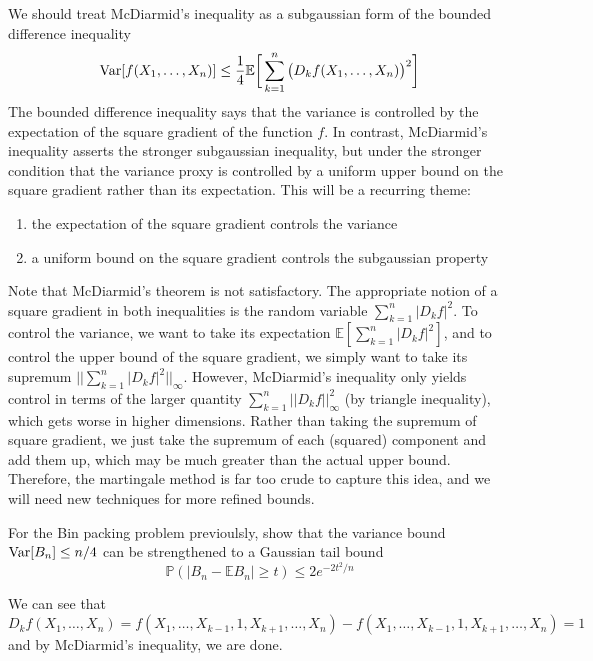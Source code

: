   We should treat McDiarmid's inequality as a subgaussian form of the bounded difference inequality 
  \[\Var[ f(X_1, \ldots, X_n)] \leq \frac{1}{4} \mathbb{E} \bigg[ \sum_{k=1}^n \big(D_k f (X_1, \ldots, X_n)\big)^2 \bigg]\]
  The bounded difference inequality says that the variance is controlled by the expectation of the square gradient of the function $f$. In contrast, McDiarmid's inequality asserts the stronger subgaussian inequality, but under the stronger condition that the variance proxy is controlled by a uniform upper bound on the square gradient rather than its expectation. This will be a recurring theme: 
  \begin{enumerate}
      \item the expectation of the square gradient controls the variance 
      \item a uniform bound on the square gradient controls the subgaussian property
  \end{enumerate}
  Note that McDiarmid's theorem is not satisfactory. The appropriate notion of a square gradient in both inequalities is the random variable $\sum_{k=1}^n |D_k f|^2$. To control the variance, we want to take its expectation $\mathbb{E} [\sum_{k=1}^n |D_k f|^2]$, and to control the upper bound of the square gradient, we simply want to take its supremum $|| \sum_{k=1}^n |D_k f|^2||_\infty$. However, McDiarmid's inequality only yields control in terms of the larger quantity $\sum_{k=1}^n || D_k f||^2_\infty$ (by triangle inequality), which gets worse in higher dimensions. Rather than taking the supremum of square gradient, we just take the supremum of each (squared) component and add them up, which may be much greater than the actual upper bound. Therefore, the martingale method is far too crude to capture this idea, and we will need new techniques for more refined bounds. 

  \begin{exercise}
  For the Bin packing problem previoulsly, show that the variance bound $\Var[B_n] \leq n/4$ can be strengthened to a Gaussian tail bound 
  \[\mathbb{P}(|B_n - \mathbb{E} B_n| \geq t) \leq 2e^{-2t^2/n}\]
  \end{exercise}
  \begin{solution}
  We can see that 
  \[D_k f(X_1, \ldots, X_n) = f(X_1, \ldots, X_{k-1}, 1, X_{k+1}, \ldots, X_n) - f(X_1, \ldots, X_{k-1}, 1, X_{k+1}, \ldots, X_n) = 1\]
  and by McDiarmid's inequality, we are done. 
  \end{solution}

  \begin{exercise}

  \end{exercise}

